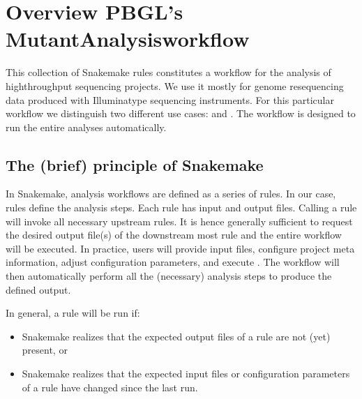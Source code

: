 \documentclass[letterpaper,10pt,english]{sphinxhowto}
\begin{document}
        \newcommand{\sectionbreak}{\clearpage}

\pagestyle{plain}
\sphinxtableofcontents
\pagestyle{normal}
\label{\detokenize{index::doc}}



\section{Overview PBGL’s Mutant\sphinxhyphen{}Analysis\sphinxhyphen{}workflow}
\label{\detokenize{index:overview-pbgl-s-mutant-analysis-workflow}}
This collection of Snakemake rules constitutes a workflow for the analysis of high\sphinxhyphen{}throughput sequencing projects. We use it mostly for genome re\sphinxhyphen{}sequencing data produced with Illumina\sphinxhyphen{}type sequencing instruments.
For this particular workflow we distinguish two different use cases:  and . The workflow is designed to run the entire analyses automatically.


\subsection{The (brief) principle of Snakemake}
\label{\detokenize{index:the-brief-principle-of-snakemake}}
In Snakemake, analysis workflows are defined as a series of rules. In our case, rules define the analysis steps. Each rule has input and output files. Calling a rule will invoke all necessary upstream rules. It is hence generally sufficient to request the desired output file(s) of the downstream most rule and the entire workflow will be executed.
In practice, users will provide input files, configure project meta information, adjust configuration parameters, and execute . The workflow will then automatically perform all the (necessary) analysis steps to produce the defined output.

In general, a rule will be run if:
\begin{itemize}
\item {} 
Snakemake realizes that the expected output files of a rule are not (yet) present, or

\item {} 
Snakemake realizes that the expected input files or configuration parameters of a rule have changed since the last run.

\end{itemize}
\end{document}
